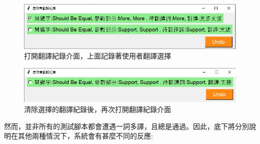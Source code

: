 \begin{figure}[H]
\centering
\includegraphics[width= \textwidth]{../論文截圖/4-3-4 介面上記錄著使用者翻譯選擇.png}
\caption{打開翻譯紀錄介面，上面記錄著使用者翻譯選擇}
\end{figure}

\begin{figure}[H]
\centering
\includegraphics[width= \textwidth]{../論文截圖/4-3-5 將選擇的翻譯清除後，再次打開翻譯紀錄介面.png}
\caption{清除選擇的翻譯紀錄後，再次打開翻譯紀錄介面}
\end{figure}

然而，並非所有的測試腳本都會遭遇一詞多譯，且總是通過。因此，底下將分別說明在其他兩種情況下，系統會有甚麼不同的反應:

